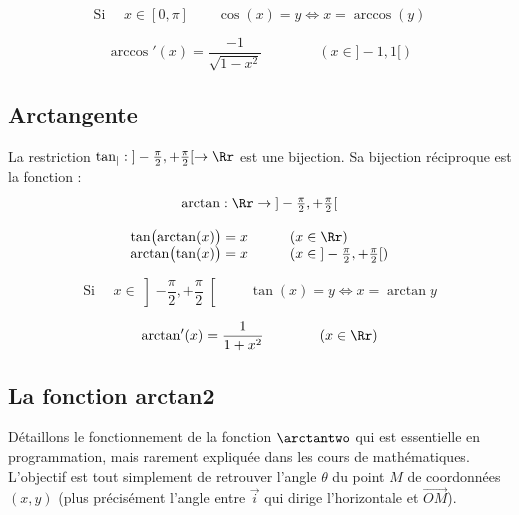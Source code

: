 \documentclass[11pt,class=report,crop=false]{standalone}
\begin{document}
$$\text{Si } \quad x\in [0,\pi] \qquad \cos(x)=y \iff x = \arccos(y)$$

$$\arccos'(x) = \frac{-1}{\sqrt{1-x^2}} \qquad\qquad (x \in {}]-1,1[)$$

\subsection{Arctangente}

La restriction $\tan_| : {}]-\tfrac\pi2,+\tfrac\pi2[ \to \Rr$
est une bijection.
Sa bijection réciproque est la fonction  :
$$\arctan : \Rr \to {}]-\tfrac\pi2,+\tfrac\pi2[$$

\begin{center}
	\begin{minipage}{0.45\textwidth}
	\end{minipage}\qquad
	\begin{minipage}{0.45\textwidth}
	\end{minipage}
\end{center}



$$
\begin{array}{cl}
	\displaystyle \tan\bigl(\arctan(x)\bigr) = x &  \qquad (x \in \Rr)\\
	\displaystyle \arctan\bigl(\tan(x)\bigr) = x &  \qquad (x \in {}]-\frac\pi2,+\frac\pi2[) \\
\end{array}
$$

$$\text{Si } \quad x\in \left]-\frac\pi2,+\frac\pi2\right[ \qquad \tan(x)=y \iff x = \arctan y$$


$$\arctan'(x) = \frac{1}{1+x^2} \qquad \qquad (x \in \Rr)$$

\subsection{La fonction arctan2}

 
Détaillons le fonctionnement de la fonction $\arctantwo$ qui est essentielle en programmation, mais rarement expliquée dans les cours de mathématiques. L'objectif est tout simplement de retrouver l'angle $\theta$ du point $M$ de coordonnées $(x,y)$ (plus précisément l'angle entre $\vec i$ qui dirige l'horizontale et $\vec{OM}$).
\end{document}
